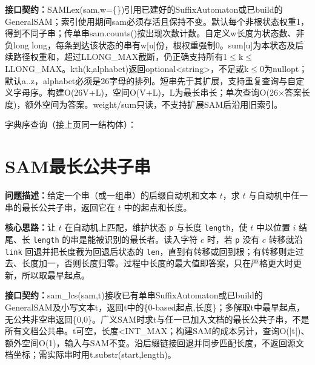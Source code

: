 {\sloppy{}\noindent\textbf{接口契约：}SAMLex(sam,w=\{\})引用已建好的SuffixAutomaton或已build的GeneralSAM；索引使用期间sam必须存活且保持不变。默认每个非根状态权重1，得到不同子串；传单串sam.counts()按出现次数计数。自定义w长度为状态数、非负long long，每条到达该状态的串有w[u]份，根权重强制0。sum[u]为本状态及后续路径权重和，超过LLONG\_MAX截断，仍正确支持所有1$\le$k$\le$LLONG\_MAX。kth(k,alphabet)返回optional<string>，不足或k$\le$0为nullopt；默认a..z，alphabet必须是26字母的排列。短串先于其扩展，支持重复查询与自定义字母序。构建O(26V+L)，空间O(V+L)，L为最长串长；单次查询O(26×答案长度)，额外空间为答案。weight/sum只读，不支持扩展SAM后沿用旧索引。\par}

\Needspace{387pt}



\newpage

\noindent 字典序查询（接上页同一结构体）：



\Needspace{464pt}

\section{SAM最长公共子串}\label{compact-sam_lcs}

\noindent\textbf{问题描述：}\allowbreak 给定一个串（或一组串）的后缀自动机和文本 $t$，求 $t$ 与自动机中任一串的最长公共子串，返回它在 $t$ 中的起点和长度。

\textbf{核心思路：}\allowbreak 让 $t$ 在自动机上匹配，维护状态 \texttt{p} 与长度 \texttt{length}，使 $t$ 中以位置 $i$ 结尾、长 \texttt{length} 的串是能被识别的最长者。读入字符 $c$ 时，若 \texttt{p} 没有 $c$ 转移就沿 \texttt{link} 回退并把长度截为回退后状态的 \texttt{len}，直到有转移或回到根；有转移则走过去、长度加一，否则长度归零。过程中长度的最大值即答案，只在严格更大时更新，所以取最早起点。



{\sloppy{}\noindent\textbf{接口契约：}sam\_lcs(sam,t)接收已有单串SuffixAutomaton或已build的GeneralSAM及小写文本t，返回t中的\{0-based起点,长度\}；多解取t中最早起点，无公共非空串返回\{0,0\}。广义SAM时求t与任一已加入文档的最长公共子串，不是所有文档公共串。t可空，长度<INT\_MAX；构建SAM的成本另计，查询O(|t|)、额外空间O(1)，输入与SAM不变。沿后缀链接回退并同步匹配长度，不返回源文档坐标；需实际串时用t.substr(start,length)。\par}

